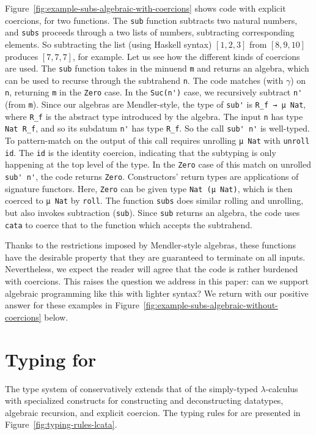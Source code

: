 \documentclass[pdflatex,sn-mathphys-num]{sn-jnl}%
\theoremstyle{thmstyleone}%
\theoremstyle{thmstyletwo}%
\theoremstyle{thmstylethree}%
\begin{document}
Figure~\ref{fig:example-subs-algebraic-with-coercions} shows code with
explicit coercions, for two functions.  The \verb|sub| function
subtracts two natural numbers, and \verb|subs| proceeds through a two
lists of numbers, subtracting corresponding elements.  So subtracting
the list (using Haskell syntax) $[1,2,3]$ from $[8,9,10]$ produces
$[7,7,7]$, for example.  Let us see how the different kinds
of coercions are used.  The \verb|sub| function takes in the minuend \verb|m|
and returns an algebra, which can be used to recurse through the
subtrahend \verb|n|.  The code matches (with $\gamma$) on \verb|n|,
returning \verb|m| in the \verb|Zero| case.  In the \verb|Suc(n')|
case, we recursively subtract \verb|n'| (from \verb|m|).  Since our
algebras are Mendler-style, the type of \verb|sub'| is
\verb|R_f → μ Nat|, where \verb|R_f| is the abstract type introduced by
the algebra.  The input \verb|n| has type \verb|Nat R_f|, and so its subdatum
\verb|n'| has type \verb|R_f|.  So the call \verb|sub' n'| is
well-typed.  To pattern-match on the output of this call requires
unrolling \verb|μ Nat| with \verb|unroll id|.  The \verb|id| is
the identity coercion, indicating that the subtyping is only happening
at the top level of the type.  In the \verb|Zero| case of this match
on unrolled \verb|sub' n'|, the code returns \verb|Zero|.
Constructors' return types are applications of signature functors.
Here, \verb|Zero| can be given type \verb|Nat (μ Nat)|, which is then
coerced to \verb|μ Nat| by \verb|roll|.  The function \verb|subs| does
similar rolling and unrolling, but also invokes subtraction
(\verb|sub|).  Since \verb|sub| returns an algebra, the code uses
\verb|cata| to coerce that to the function which accepts the
subtrahend.

Thanks to the restrictions imposed by Mendler-style algebras, these
functions have the desirable property that they are guaranteed to
terminate on all inputs.  Nevertheless, we expect the reader will
agree that the code is rather burdened with coercions.  This
raises the question we address in this paper: can we support algebraic
programming like this with lighter syntax?  We return with our
positive answer for these examples in
Figure~\ref{fig:example-subs-algebraic-without-coercions} below.

\section{Typing for \lcata}
\label{sec:typing}

The type system of \lcata conservatively extends that of the simply-typed $\lambda$-calculus with specialized constructs for constructing and deconstructing datatypes, algebraic recursion, and explicit coercion.
The typing rules for \lcata are presented in Figure~\ref{fig:typing-rules-lcata}.
\end{document}
